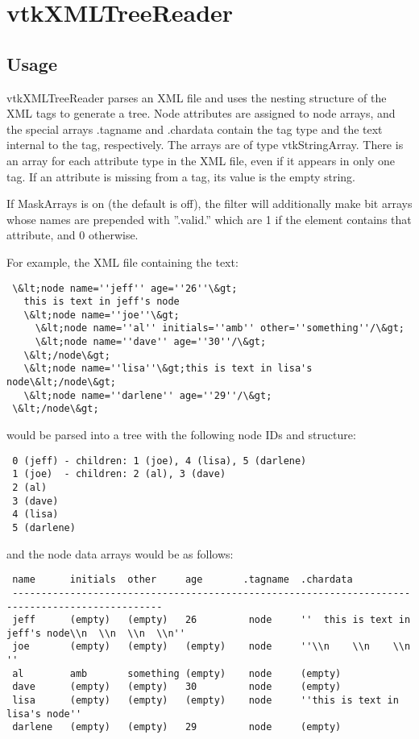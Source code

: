 \section{vtkXMLTreeReader}

\subsection{Usage}

 vtkXMLTreeReader parses an XML file and uses the nesting structure of the
 XML tags to generate a tree.  Node attributes are assigned to node arrays,
 and the special arrays .tagname and .chardata contain the tag type and the
 text internal to the tag, respectively.  The arrays are of type
 vtkStringArray.  There is an array for each attribute type in the XML file,
 even if it appears in only one tag.  If an attribute is missing from a tag,
 its value is the empty string.

 If MaskArrays is on (the default is off), the filter will additionally make bit
 arrays whose names are prepended with ''.valid.'' which are 1 if the element 
 contains that attribute, and 0 otherwise. 

 For example, the XML file containing the text:
 \begin{verbatim}
 \&lt;node name=''jeff'' age=''26''\&gt;
   this is text in jeff's node
   \&lt;node name=''joe''\&gt;
     \&lt;node name=''al'' initials=''amb'' other=''something''/\&gt;
     \&lt;node name=''dave'' age=''30''/\&gt;
   \&lt;/node\&gt;
   \&lt;node name=''lisa''\&gt;this is text in lisa's node\&lt;/node\&gt;
   \&lt;node name=''darlene'' age=''29''/\&gt;
 \&lt;/node\&gt;
 \end{verbatim}

 would be parsed into a tree with the following node IDs and structure:

 \begin{verbatim}
 0 (jeff) - children: 1 (joe), 4 (lisa), 5 (darlene)
 1 (joe)  - children: 2 (al), 3 (dave)
 2 (al)
 3 (dave)
 4 (lisa)
 5 (darlene)
 \end{verbatim}

 and the node data arrays would be as follows:

 \begin{verbatim}
 name      initials  other     age       .tagname  .chardata
 ------------------------------------------------------------------------------------------------
 jeff      (empty)   (empty)   26         node     ''  this is text in jeff's node\\n  \\n  \\n  \\n''
 joe       (empty)   (empty)   (empty)    node     ''\\n    \\n    \\n  ''
 al        amb       something (empty)    node     (empty)
 dave      (empty)   (empty)   30         node     (empty)
 lisa      (empty)   (empty)   (empty)    node     ''this is text in lisa's node''
 darlene   (empty)   (empty)   29         node     (empty)
 \end{verbatim}

